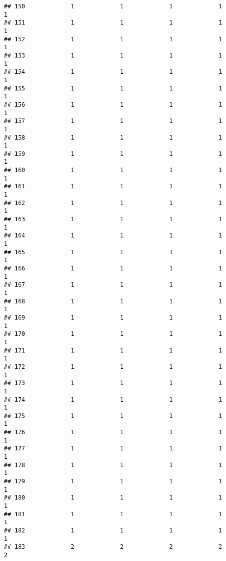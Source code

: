 \documentclass[
]{article}
\begin{document}
\begin{verbatim}
## 150             1             1             1             1             1
## 151             1             1             1             1             1
## 152             1             1             1             1             1
## 153             1             1             1             1             1
## 154             1             1             1             1             1
## 155             1             1             1             1             1
## 156             1             1             1             1             1
## 157             1             1             1             1             1
## 158             1             1             1             1             1
## 159             1             1             1             1             1
## 160             1             1             1             1             1
## 161             1             1             1             1             1
## 162             1             1             1             1             1
## 163             1             1             1             1             1
## 164             1             1             1             1             1
## 165             1             1             1             1             1
## 166             1             1             1             1             1
## 167             1             1             1             1             1
## 168             1             1             1             1             1
## 169             1             1             1             1             1
## 170             1             1             1             1             1
## 171             1             1             1             1             1
## 172             1             1             1             1             1
## 173             1             1             1             1             1
## 174             1             1             1             1             1
## 175             1             1             1             1             1
## 176             1             1             1             1             1
## 177             1             1             1             1             1
## 178             1             1             1             1             1
## 179             1             1             1             1             1
## 180             1             1             1             1             1
## 181             1             1             1             1             1
## 182             1             1             1             1             1
## 183             2             2             2             2             2

\end{verbatim}
\end{document}
